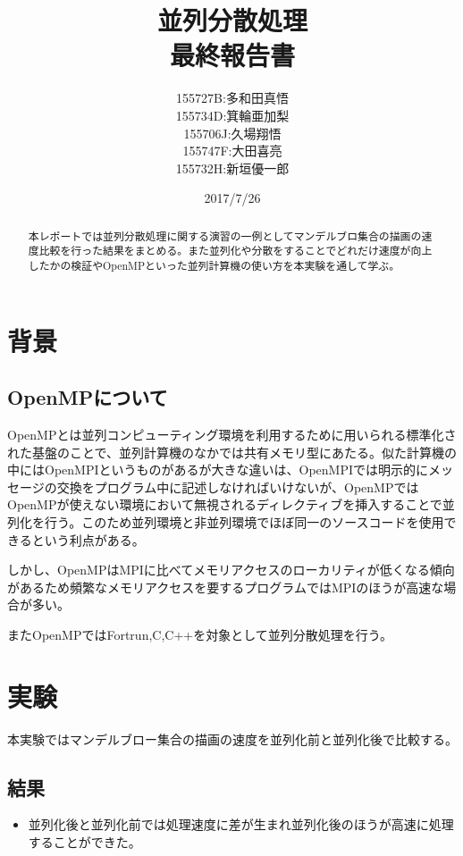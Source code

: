 \documentclass[twocolumn,11pt]{jarticle} %
\title{並列分散処理\\ 最終報告書}
\author{155727B:多和田真悟\\ 155734D:箕輪亜加梨\\ 155706J:久場翔悟\\ 155747F:大田喜亮\\ 155732H:新垣優一郎}
\date{2017/7/26}
\begin{document}
\begin{titlepage}
    \maketitle
	\thispagestyle{empty}
\end{titlepage}

\setcounter{page}{1} %
\pagestyle{plain}

\newpage
\begin{abstract}
本レポートでは並列分散処理に関する演習の一例としてマンデルブロ集合の描画の速度比較を行った結果をまとめる。また並列化や分散をすることでどれだけ速度が向上したかの検証やOpenMPといった並列計算機の使い方を本実験を通して学ぶ。
\end{abstract}

\section{背景}
\subsection{OpenMPについて}
OpenMPとは並列コンピューティング環境を利用するために用いられる標準化された基盤のことで、並列計算機のなかでは共有メモリ型にあたる。似た計算機の中にはOpenMPIというものがあるが大きな違いは、OpenMPIでは明示的にメッセージの交換をプログラム中に記述しなければいけないが、OpenMPではOpenMPが使えない環境において無視されるディレクティブを挿入することで並列化を行う。このため並列環境と非並列環境でほぼ同一のソースコードを使用できるという利点がある。

しかし、OpenMPはMPIに比べてメモリアクセスのローカリティが低くなる傾向があるため頻繁なメモリアクセスを要するプログラムではMPIのほうが高速な場合が多い\cite{openmp}。

またOpenMPではFortrun,C,C++を対象として並列分散処理を行う。

\section{実験}
本実験ではマンデルブロー集合の描画の速度を並列化前と並列化後で比較する。

\subsection{結果}
\begin{itemize}
    \item 並列化後と並列化前では処理速度に差が生まれ並列化後のほうが高速に処理することができた。
\end{itemize}
\end{document}
